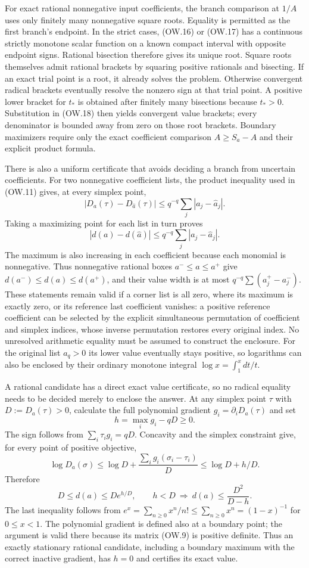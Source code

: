 \documentclass[11pt]{article}
\begin{document}
For exact rational nonnegative input coefficients, the branch
comparison at $1/A$ uses only finitely many nonnegative square roots.
Equality is permitted as the first branch's endpoint. In the strict
cases, (OW.16) or (OW.17) has a continuous strictly monotone scalar
function on a known compact interval with opposite endpoint signs.
Rational bisection therefore gives its unique root. Square roots
themselves admit rational brackets by squaring positive rationals
and bisecting. If an exact trial point is a root, it already solves
the problem. Otherwise convergent radical brackets eventually
resolve the nonzero sign at that trial point. A positive lower
bracket for $t_*$ is obtained after finitely many bisections because
$t_*>0$. Substitution in (OW.18) then yields convergent value
brackets; every denominator is bounded away from zero on those
root brackets. Boundary maximizers require only the exact coefficient
comparison $A\ge S_a-A$ and their explicit product formula.

There is also a uniform certificate that avoids deciding a branch
from uncertain coefficients. For two nonnegative coefficient lists,
the product inequality used in (OW.11) gives, at every simplex point,
\[
 |D_a(\tau)-D_{\widehat a}(\tau)|
       \le q^{-q}\sum_j|a_j-\widehat a_j|.
\]
Taking a maximizing point for each list in turn proves
\[
 \boxed{|d(a)-d(\widehat a)|
       \le q^{-q}\sum_j|a_j-\widehat a_j|.}              \tag{OW.22}
\]
The maximum is also increasing in each coefficient because each
monomial is nonnegative. Thus nonnegative rational boxes
$a^-\le a\le a^+$ give $d(a^-)\le d(a)\le d(a^+)$, and their
value width is at most $q^{-q}\sum(a_j^+-a_j^-)$.
These statements remain valid if a corner list is all zero, where
its maximum is exactly zero, or its reference last coefficient
vanishes: a positive reference coefficient can be selected by the
explicit simultaneous permutation of coefficient and simplex indices,
whose inverse permutation restores every original index. No
unresolved arithmetic equality must be assumed to construct the
enclosure. For the original list $a_q>0$ its lower value eventually
stays positive, so logarithms can also be enclosed by their ordinary
monotone integral $\log x=\int_1^xdt/t$.

A rational candidate has a direct exact value certificate, so no radical
equality needs to be decided merely to enclose the answer. At any simplex
point $\tau$ with $D:=D_a(\tau)>0$, calculate the full polynomial
gradient $g_i=\partial_iD_a(\tau)$ and set
\[
 h=\max_i g_i-qD\ge0.
\]
The sign follows from $\sum_i\tau_i g_i=qD$. Concavity and the
simplex constraint give, for every point of positive objective,
\[
 \log D_a(\sigma)\le\log D+
       \frac{\sum_i g_i(\sigma_i-\tau_i)}D
       \le\log D+h/D.
\]
Therefore
\[
 \boxed{D\le d(a)\le D e^{h/D},\qquad
 h<D\ \Longrightarrow\ d(a)\le\frac{D^2}{D-h}.}         \tag{OW.22a}
\]
The last inequality follows from
$e^x=\sum_{n\ge0}x^n/n!\le\sum_{n\ge0}x^n=(1-x)^{-1}$
for $0\le x<1$. The polynomial gradient is defined also at a
boundary point; the argument is valid there because its matrix
(OW.9) is positive definite. Thus an exactly stationary rational
candidate, including a boundary maximum with the correct inactive
gradient, has $h=0$ and certifies its exact value.
\end{document}
